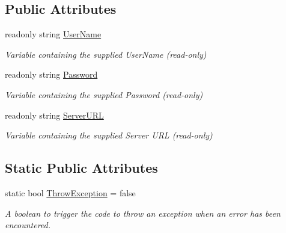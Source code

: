 \subsection*{Public Attributes}
\begin{DoxyCompactItemize}
\item 
readonly string \hyperlink{class_connector_a41d247f09774f0ed206ce1a4a2463fed}{User\+Name}
\begin{DoxyCompactList}\small\item\em Variable containing the supplied User\+Name (read-\/only) \end{DoxyCompactList}\item 
readonly string \hyperlink{class_connector_a7dd469898462ef761d256392766461fe}{Password}
\begin{DoxyCompactList}\small\item\em Variable containing the supplied Password (read-\/only) \end{DoxyCompactList}\item 
readonly string \hyperlink{class_connector_ac0cae400459978dde8030f75208e48f1}{Server\+U\+RL}
\begin{DoxyCompactList}\small\item\em Variable containing the supplied Server U\+RL (read-\/only) \end{DoxyCompactList}\end{DoxyCompactItemize}
\subsection*{Static Public Attributes}
\begin{DoxyCompactItemize}
\item 
static bool \hyperlink{class_connector_a8ec0dcdbb4a85a56fa50f67686484c19}{Throw\+Exception} = false
\begin{DoxyCompactList}\small\item\em A boolean to trigger the code to throw an exception when an error has been encountered. \end{DoxyCompactList}\end{DoxyCompactItemize}
